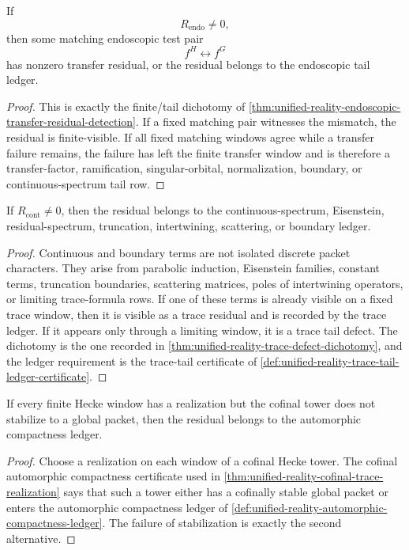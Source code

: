 \begin{theorem}
\label{thm:unified-reality-endoscopic-residual-fixed-window-or-ledgered}
If
$$
R_{\mathrm{endo}}\ne0,
$$
then some matching endoscopic test pair
$$
f^H\leftrightarrow f^G
$$
has nonzero transfer residual, or the residual belongs to the
endoscopic tail ledger.
\end{theorem}
\begin{proof}
This is exactly the finite/tail dichotomy of
\autoref{thm:unified-reality-endoscopic-transfer-residual-detection}.
If a fixed matching pair witnesses the mismatch, the residual is
finite-visible. If all fixed matching windows agree while a transfer
failure remains, the failure has left the finite transfer window and is
therefore a transfer-factor, ramification, singular-orbital,
normalization, boundary, or continuous-spectrum tail row.
\end{proof}

\begin{theorem}
\label{thm:unified-reality-continuous-boundary-residual-ledgered}
If $R_{\mathrm{cont}}\ne0$, then the residual belongs to the
continuous-spectrum, Eisenstein, residual-spectrum, truncation,
intertwining, scattering, or boundary ledger.
\end{theorem}
\begin{proof}
Continuous and boundary terms are not isolated discrete packet
characters. They arise from parabolic induction, Eisenstein families,
constant terms, truncation boundaries, scattering matrices, poles of
intertwining operators, or limiting trace-formula rows. If one of these
terms is already visible on a fixed trace window, then it is visible as
a trace residual and is recorded by the trace ledger. If it appears
only through a limiting window, it is a trace tail defect. The
dichotomy is the one recorded in
\autoref{thm:unified-reality-trace-defect-dichotomy}, and the ledger
requirement is the trace-tail certificate of
\autoref{def:unified-reality-trace-tail-ledger-certificate}.
\end{proof}

\begin{theorem}
\label{thm:unified-reality-cofinal-tail-residual-dichotomy}
If every finite Hecke window has a realization but the cofinal tower
does not stabilize to a global packet, then the residual belongs to the
automorphic compactness ledger.
\end{theorem}
\begin{proof}
Choose a realization on each window of a cofinal Hecke tower. The
cofinal automorphic compactness certificate used in
\autoref{thm:unified-reality-cofinal-trace-realization} says that such
a tower either has a cofinally stable global packet or enters the
automorphic compactness ledger of
\autoref{def:unified-reality-automorphic-compactness-ledger}. The
failure of stabilization is exactly the second alternative.
\end{proof}

